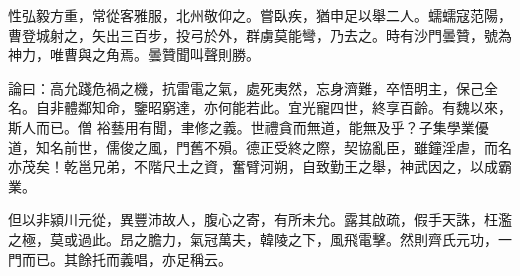 \begin{pinyinscope}
 性弘毅方重，常從客雅服，北州敬仰之。嘗臥疾，猶申足以舉二人。蠕蠕寇范陽，曹登城射之，矢出三百步，投弓於外，群虜莫能彎，乃去之。時有沙門曇贊，號為神力，唯曹與之角焉。曇贊聞叫聲則勝。



 論曰：高允踐危禍之機，抗雷電之氣，處死夷然，忘身濟難，卒悟明主，保己全名。自非體鄰知命，鑒昭窮達，亦何能若此。宜光寵四世，終享百齡。有魏以來，斯人而已。僧
 裕藝用有聞，聿修之義。世禮貪而無道，能無及乎？子集學業優道，知名前世，儒俊之風，門舊不殞。德正受終之際，契協亂臣，雖鐘淫虐，而名亦茂矣！乾邕兄弟，不階尺土之資，奮臂河朔，自致勤王之舉，神武因之，以成霸業。



 但以非潁川元從，異豐沛故人，腹心之寄，有所未允。露其啟疏，假手天誅，枉濫之極，莫或過此。昂之膽力，氣冠萬夫，韓陵之下，風飛電擊。然則齊氏元功，一門而已。其餘托而義唱，亦足稱云。



\end{pinyinscope}